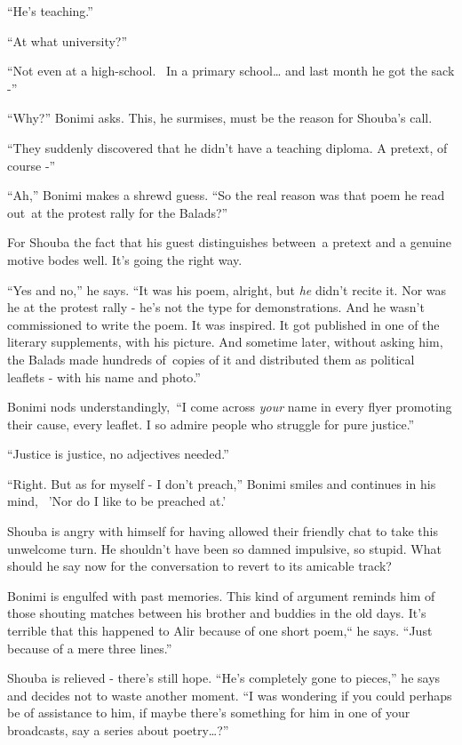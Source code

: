 \documentclass[twoside,11pt]{book}
\begin{document}
``He's teaching.''

``At what university?''

``Not even {at} a high-school.{ \ }{In a} primary
school{\dots} and last month he got the sack -''

``Why?'' Bonimi asks. This, he surmises, must be the reason for Shouba's call.

``They suddenly discovered that he didn't have a teaching diploma. A pretext, of course -''

``Ah,'' Bonimi makes a shrewd guess. ``So the real reason was that poem he read
out~at the protest rally for the Balads?''

For Shouba the fact that his guest distinguishes between~a pretext and a genuine motive bodes well. It's going the right
way.

``Yes and no,'' he says. ``It was his poem, alright, but \textit{he} didn't
recite it. Nor was he at the protest rally - he's not the type for demonstrations. And he wasn't commissioned to write
the poem. It was inspired. It got published in one of the literary supplements, with his picture. And sometime later,
without asking him, the Balads made hundreds of~copies of it and distributed them as political leaflets - with his name
and photo.''

Bonimi nods understandingly,~``I come across \textit{your }name in every flyer promoting their cause, every
leaflet. I so admire people who struggle for pure justice.''

``Justice is justice, no adjectives needed.''

``Right. But as for myself - I don't preach,'' Bonimi smiles and continues in his mind,
\ {}'Nor do I like to be preached at.'

Shouba is angry with himself for having allowed their friendly chat to take this unwelcome turn. He shouldn't have been
so damned impulsive, so stupid. What should he say now for the conversation to revert to its amicable track?

Bonimi is engulfed with past memories. This kind of argument reminds him of those shouting matches between his brother
and buddies in the old days. It's terrible that this happened to Alir because of one short poem,`` he says. ``Just
because of{ }{a }mere three lines.''

Shouba is relieved - there's still hope. ``He's completely gone to pieces,'' he says and
decides not to waste another moment. ``I was wondering if you could perhaps be of assistance to him, if
maybe there's something for him in one of your broadcasts, say a series about poetry{\dots}?''
\end{document}
